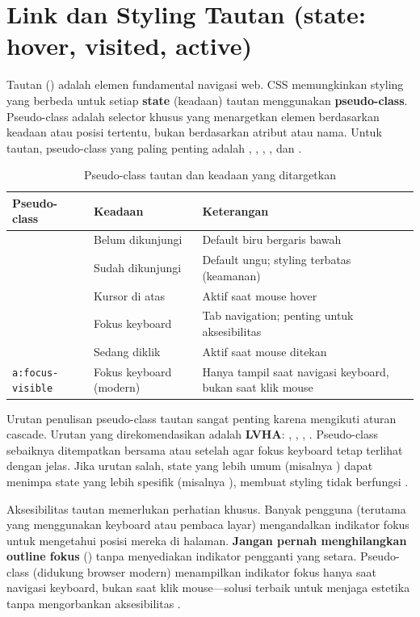 ﻿\section{Link dan Styling Tautan (state: hover, visited, active)}

Tautan () adalah elemen fundamental navigasi web. CSS memungkinkan styling yang berbeda untuk setiap \textbf{state} (keadaan) tautan menggunakan \textbf{pseudo-class}. Pseudo-class adalah selector khusus yang menargetkan elemen berdasarkan keadaan atau posisi tertentu, bukan berdasarkan atribut atau nama. Untuk tautan, pseudo-class yang paling penting adalah , , , , dan  \cite{webdevCss}.

\begin{table}[H]
\centering
\begin{tabular}{|P{3cm}|P{3.5cm}|P{5.5cm}|}
\hline
\textbf{Pseudo-class} & \textbf{Keadaan} & \textbf{Keterangan} \\
\hline
{} & Belum dikunjungi & Default biru bergaris bawah \\
\hline
{} & Sudah dikunjungi & Default ungu; styling terbatas (keamanan) \\
\hline
{} & Kursor di atas & Aktif saat mouse hover \\
\hline
{} & Fokus keyboard & Tab navigation; penting untuk aksesibilitas \\
\hline
{} & Sedang diklik & Aktif saat mouse ditekan \\
\hline
\texttt{a:\allowbreak focus-visible} & Fokus keyboard (modern) & Hanya tampil saat navigasi keyboard, bukan saat klik mouse \\
\hline
\end{tabular}
\caption{Pseudo-class tautan dan keadaan yang ditargetkan}
\end{table}

Urutan penulisan pseudo-class tautan sangat penting karena mengikuti aturan cascade. Urutan yang direkomendasikan adalah \textbf{LVHA}: , , , . Pseudo-class  sebaiknya ditempatkan bersama atau setelah  agar fokus keyboard tetap terlihat dengan jelas. Jika urutan salah, state yang lebih umum (misalnya ) dapat menimpa state yang lebih spesifik (misalnya ), membuat styling tidak berfungsi \cite{mdnCss}.

Aksesibilitas tautan memerlukan perhatian khusus. Banyak pengguna (terutama yang menggunakan keyboard atau pembaca layar) mengandalkan indikator fokus untuk mengetahui posisi mereka di halaman. \textbf{Jangan pernah menghilangkan outline fokus} () tanpa menyediakan indikator pengganti yang setara. Pseudo-class  (didukung browser modern) menampilkan indikator fokus hanya saat navigasi keyboard, bukan saat klik mouse---solusi terbaik untuk menjaga estetika tanpa mengorbankan aksesibilitas \cite{mdnAccessibility}.

